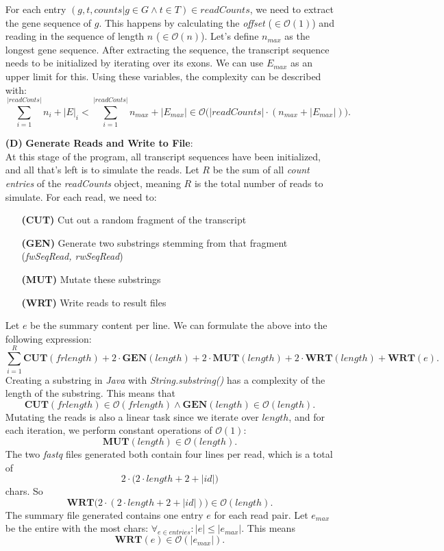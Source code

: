 \documentclass[12pt]{article}
\begin{document}
\begin{enumerate}
		For each entry $(g, t, counts | g \in G \land t \in T) \in readCounts$, we need to extract the gene sequence of $g$.
		This happens by calculating the \textit{offset} ($\in \mathcal{O}(1)$) and reading in the sequence of length $n$ ($\in \mathcal{O}(n)$).
		Let's define $n_{max}$ as the longest gene sequence.
		After extracting the sequence, the transcript sequence needs to be initialized by iterating over its exons.
		We can use $E_{max}$ as an upper limit for this.
		Using these variables, the complexity can be described with:
		\[
			\sum_{i=1}^{|readConts|} n_{i} + |E|_{i} < \sum_{i=1}^{|readConts|} n_{max} + |E_{max}| \in \mathcal{O}\Big(|readCounts| \cdot (n_{max} + |E_{max}|)\Big)
			.\]
	\item[\textbf{(D)}] \textbf{Generate Reads and Write to File}:\\
		At this stage of the program, all transcript sequences have been initialized, and all that's left is to simulate the reads.
		Let $R$ be the sum of all \textit{count entries} of the \textit{readCounts} object, meaning $R$ is the total number of reads to
		simulate. For each read, we need to:
		\begin{enumerate}
			\item[\textbf{(CUT)}] Cut out a random fragment of the transcript
			\item[\textbf{(GEN)}] Generate two substrings stemming from that fragment (\textit{fwSeqRead, rwSeqRead})
			\item[\textbf{(MUT)}] Mutate these substrings
			\item[\textbf{(WRT)}] Write reads to result files
		\end{enumerate}
		Let $e$ be the summary content per line. We can formulate the above into the following expression:
		\[
			\sum_{i=1}^{R} \mathbf{CUT}(frlength) + 2 \cdot \mathbf{GEN}(length) + 2 \cdot \mathbf{MUT}(length) + 2 \cdot \mathbf{WRT}(length) + \mathbf{WRT}(e)
			.\]
		Creating a substring in \textit{Java} with \textit{String.substring()} has a complexity of the length of the substring.
		This means that
		\[
			\mathbf{CUT}(frlength) \in \mathcal{O}(frlength) \land \mathbf{GEN}(length) \in \mathcal{O}(length)
			.\]
		Mutating the reads is also a linear task since we iterate over $length$, and for each iteration, we perform
		constant operations of $\mathcal{O}(1)$:
		\[
			\mathbf{MUT}(length) \in \mathcal{O}(length)
			.\]
		The two \textit{fastq} files generated both contain four lines per read, which is a total of
		\[
			2 \cdot \big(2 \cdot length + 2 + |id|\big)
		\]
		chars. So
		\[
			\mathbf{WRT}\big(2 \cdot (2 \cdot length + 2 + |id|)\big) \in \mathcal{O}(length)
			.\]
		The summary file generated contains one entry $e$ for each read pair. Let $e_{max}$ be the entire with the most chars: $\forall_{e \in entries}: |e| \le |e_{max}|$.
		This means
		\[
			\mathbf{WRT}(e) \in \mathcal{O}(|e_{max}|)
			.\]


\end{enumerate}
\end{document}
